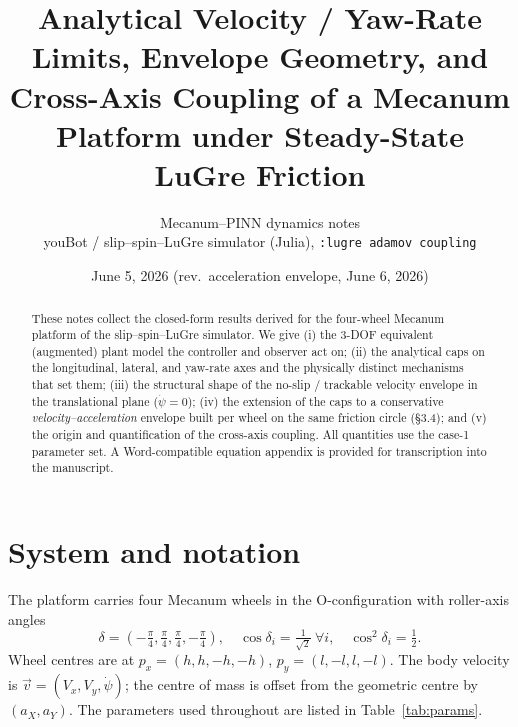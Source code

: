 \documentclass[11pt]{article}
\title{Analytical Velocity / Yaw-Rate Limits, Envelope Geometry, and
Cross-Axis Coupling of a Mecanum Platform under Steady-State LuGre Friction}
\author{Mecanum--PINN dynamics notes\\
\small youBot / slip--spin--LuGre simulator (Julia), \texttt{:lugre adamov coupling}}
\date{June 5, 2026 \quad(rev.\ acceleration envelope, June 6, 2026)}
\begin{document}
\maketitle

\begin{abstract}
These notes collect the closed-form results derived for the four-wheel Mecanum platform of
the slip--spin--LuGre simulator. We give (i) the 3-DOF equivalent (augmented) plant model
the controller and observer act on; (ii) the analytical caps on the longitudinal, lateral, and
yaw-rate axes and the physically distinct mechanisms that set them; (iii) the structural shape
of the no-slip / trackable velocity envelope in the translational plane ($\dot\psi=0$); (iv) the
extension of the caps to a conservative \emph{velocity--acceleration} envelope built per wheel
on the same friction circle (\S3.4); and (v) the origin and quantification of the cross-axis
coupling. All quantities use the case-1 parameter set. A Word-compatible equation appendix is
provided for transcription into the manuscript.
\end{abstract}

\section{System and notation}
The platform carries four Mecanum wheels in the O-configuration with roller-axis angles
\begin{equation}
\delta=\left(-\tfrac{\pi}{4},\tfrac{\pi}{4},\tfrac{\pi}{4},-\tfrac{\pi}{4}\right),\quad
\cos\delta_i=\tfrac{1}{\sqrt2}\ \forall i,\quad \cos^2\delta_i=\tfrac12 .
\end{equation}
Wheel centres are at $p_x=(h,h,-h,-h)$, $p_y=(l,-l,l,-l)$. The body velocity is
$\vec v=(V_x,V_y,\dot\psi)$; the centre of mass is offset from the geometric centre by
$(a_X,a_Y)$. The parameters used throughout are listed in Table~\ref{tab:params}.
\end{document}
